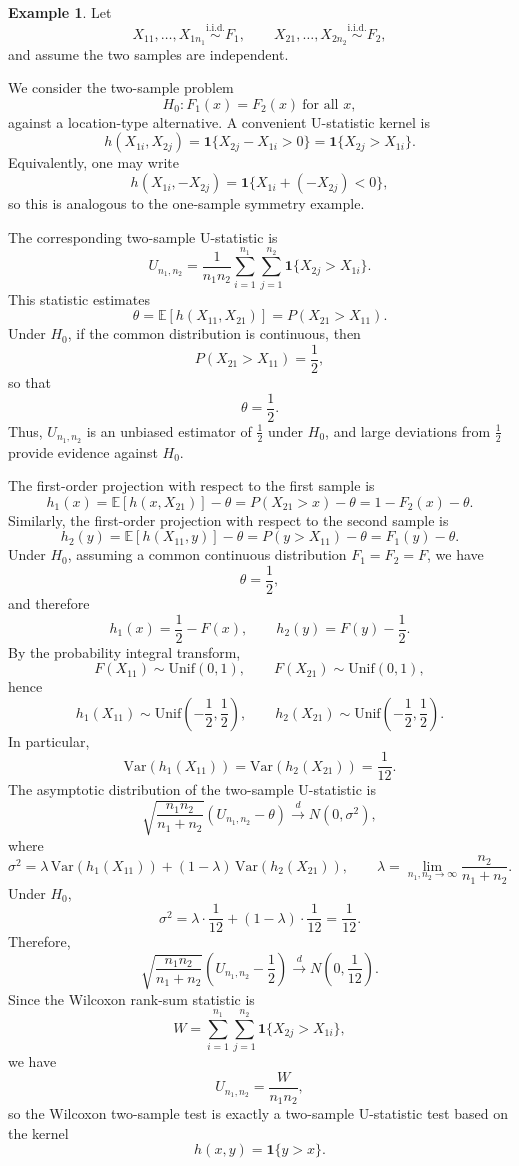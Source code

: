 \documentclass[11pt]{article}
\theoremstyle{definition}
\newtheorem{exmp}{Example}[section]
\begin{document}
\begin{exmp}
Let
\[
X_{11},\dots,X_{1n_1}\overset{\text{i.i.d.}}{\sim}F_1,
\qquad
X_{21},\dots,X_{2n_2}\overset{\text{i.i.d.}}{\sim}F_2,
\]
and assume the two samples are independent.

We consider the two-sample problem
\[
H_0: F_1(x)=F_2(x)\ \text{for all }x,
\]
against a location-type alternative. A convenient U-statistic kernel is
\[
h(X_{1i},X_{2j})=\mathbf{1}\{X_{2j}-X_{1i}>0\}
=\mathbf{1}\{X_{2j}>X_{1i}\}.
\]
Equivalently, one may write
\[
h(X_{1i},-X_{2j})=\mathbf{1}\{X_{1i}+(-X_{2j})<0\},
\]
so this is analogous to the one-sample symmetry example.

The corresponding two-sample U-statistic is
\[
U_{n_1,n_2}
=
\frac{1}{n_1n_2}\sum_{i=1}^{n_1}\sum_{j=1}^{n_2}
\mathbf{1}\{X_{2j}>X_{1i}\}.
\]
This statistic estimates
\[
\theta
=
\mathbb{E}[h(X_{11},X_{21})]
=
P(X_{21}>X_{11}).
\]
Under $H_0$, if the common distribution is continuous, then
\[
P(X_{21}>X_{11})=\frac12,
\]
so that
\[
\theta=\frac12.
\]
Thus, $U_{n_1,n_2}$ is an unbiased estimator of $\frac12$ under $H_0$, and large deviations from $\frac12$ provide evidence against $H_0$.

The first-order projection with respect to the first sample is
\[
h_1(x)
=
\mathbb{E}[h(x,X_{21})]-\theta
=
P(X_{21}>x)-\theta
=
1-F_2(x)-\theta.
\]
Similarly, the first-order projection with respect to the second sample is
\[
h_2(y)
=
\mathbb{E}[h(X_{11},y)]-\theta
=
P(y>X_{11})-\theta
=
F_1(y)-\theta.
\]
Under $H_0$, assuming a common continuous distribution $F_1=F_2=F$, we have
\[
\theta=\frac12,
\]
and therefore
\[
h_1(x)=\frac12-F(x),
\qquad
h_2(y)=F(y)-\frac12.
\]
By the probability integral transform,
\[
F(X_{11})\sim \mathrm{Unif}(0,1),
\qquad
F(X_{21})\sim \mathrm{Unif}(0,1),
\]
hence
\[
h_1(X_{11})\sim \mathrm{Unif}\!\left(-\frac12,\frac12\right),
\qquad
h_2(X_{21})\sim \mathrm{Unif}\!\left(-\frac12,\frac12\right).
\]
In particular,
\[
\mathrm{Var}(h_1(X_{11}))=\mathrm{Var}(h_2(X_{21}))=\frac{1}{12}.
\]
The asymptotic distribution of the two-sample U-statistic is
\[
\sqrt{\frac{n_1n_2}{n_1+n_2}}
\left(U_{n_1,n_2}-\theta\right)
\xrightarrow{d}
N\!\left(0,\sigma^2\right),
\]
where
\[
\sigma^2
=
\lambda\,\mathrm{Var}(h_1(X_{11}))
+
(1-\lambda)\,\mathrm{Var}(h_2(X_{21})),
\qquad
\lambda=\lim_{n_1,n_2\to\infty}\frac{n_2}{n_1+n_2}.
\]
Under $H_0$,
\[
\sigma^2
=
\lambda\cdot\frac{1}{12}+(1-\lambda)\cdot\frac{1}{12}
=
\frac{1}{12}.
\]
Therefore,
\[
\sqrt{\frac{n_1n_2}{n_1+n_2}}
\left(U_{n_1,n_2}-\frac12\right)
\xrightarrow{d}
N\!\left(0,\frac{1}{12}\right).
\]
Since the Wilcoxon rank-sum statistic is
\[
W=\sum_{i=1}^{n_1}\sum_{j=1}^{n_2}\mathbf{1}\{X_{2j}>X_{1i}\},
\]
we have
\[
U_{n_1,n_2}=\frac{W}{n_1n_2},
\]
so the Wilcoxon two-sample test is exactly a two-sample U-statistic test based on the kernel
\[
h(x,y)=\mathbf{1}\{y>x\}.
\]
\end{exmp}
\end{document}
